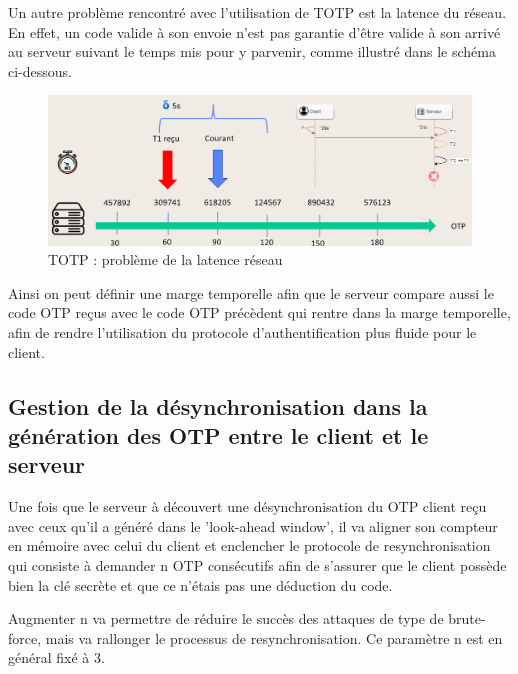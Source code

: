 \documentclass[a4paper, 10pt]{article}
\newcommand{\otp}{\textsc{OTP} }
\newcommand{\totp}{\textsc{TOTP} }
\begin{document}
    Un autre problème rencontré avec l'utilisation de \totp est la \textcolor{myblue}{latence du réseau}. 
En effet, un code valide à son envoie \textcolor{myblue}{n'est pas garantie d'être valide à son arrivé} au serveur suivant le temps mis pour y parvenir, comme illustré dans le schéma ci-dessous.

\begin{figure}[H]
        \centering
        \includegraphics[scale=0.45]{img/1/3/totp_latence.png}
        \caption{\totp: problème de la latence réseau\\}
        \label{fig:totp-latence}
\end{figure}

    
    Ainsi on peut définir une \textcolor{mygreen}{marge temporelle} afin que le serveur compare aussi le code \otp reçus avec le code \otp précèdent
qui rentre dans la marge temporelle, afin de rendre l'utilisation du protocole d'authentification plus fluide pour le client.



        \subsection{Gestion de la désynchronisation dans la génération des \otp entre le client et le serveur}


    Une fois que le serveur à \textcolor{myblue}{découvert une désynchronisation} du \otp client reçu avec ceux qu'il a généré dans le 'look-ahead window',
il va aligner son compteur en mémoire avec celui du client et \textcolor{mygreen}{enclencher le protocole de resynchronisation} qui consiste à \textcolor{mygreen}{demander n \otp consécutifs}
afin de s'assurer que le client possède bien la clé secrète et que ce n'étais pas une déduction du code.
    
    Augmenter n va permettre de réduire le succès des attaques de type de brute-force,
mais va rallonger le processus de resynchronisation. Ce paramètre n est \textcolor{mygreen}{en général fixé à 3}.
\end{document}
